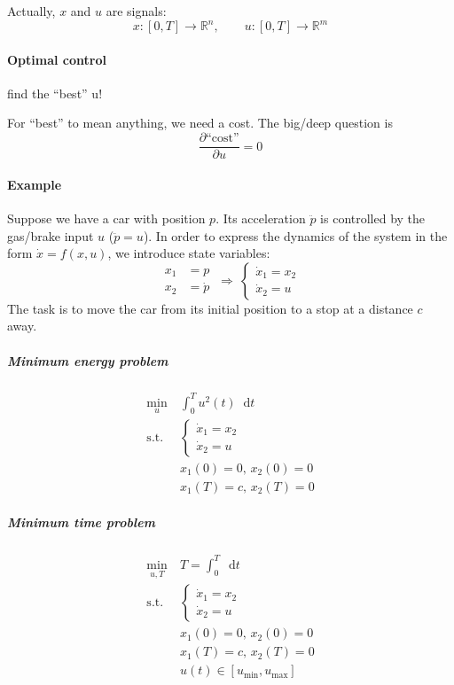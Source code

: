 \documentclass[letterpaper,12pt,titlepage]{report}
\newcommand*\dif{\mathop{}\!\mathrm{d}}
\newcommand*\R{\mathbb{R}}
\theoremstyle{plain}
\theoremstyle{definition}
\begin{document}
Actually, $x$ and $u$ are signals:
\[ x:[0,T]\to\R^n, \qquad  u:[0,T]\to\R^m \]

\paragraph{Optimal control} find the ``best'' u!

For ``best'' to mean anything, we need a cost. The big/deep question is
\[ \frac{\partial \text{``cost''}}{\partial u} = 0 \]

\paragraph{Example} \mbox{}

Suppose we have a car with position $p$. Its acceleration $\ddot{p}$ is controlled by the gas/brake input $u$ ($\ddot{p}=u$). In order to express the dynamics of the system in the form $\dot{x}=f(x,u)$, we introduce state variables:
\[
  \begin{aligned} x_1 &= p \\ x_2 &= \dot{p} \end{aligned}
  \ \Longrightarrow \
  \begin{cases} \dot{x}_1 = x_2 \\ \dot{x}_2 = u \end{cases}
\]
The task is to move the car from its initial position to a stop at a distance $c$ away.

\subparagraph{Minimum energy problem}
\begin{align}
  \min_u {}\ & \int_0^T\! u^2(t) \dif t \\
  \text{s.t. } & \begin{cases} \dot{x}_1 = x_2 \\ \dot{x}_2 = u \end{cases} \\
             & x_1(0) = 0,\, x_2(0) = 0 \\
             & x_1(T) = c,\, x_2(T) = 0
\end{align}

\subparagraph{Minimum time problem}
\begin{align}
  \min_{u,T} {}\ & T = \int_0^T\! \dif t \\
  \text{s.t. } & \begin{cases} \dot{x}_1 = x_2 \\ \dot{x}_2 = u \end{cases} \\
                 & x_1(0) = 0,\, x_2(0) = 0 \\
                 & x_1(T) = c,\, x_2(T) = 0 \\
                 & u(t) \in [u_\text{min},u_\text{max}]
\end{align}
\end{document}
